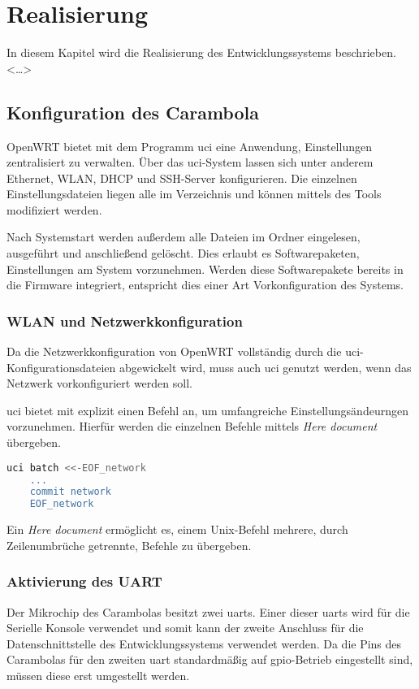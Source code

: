 \chapter{Realisierung}
In diesem Kapitel wird die Realisierung des Entwicklungssystems
beschrieben. <\ldots>
\section{Konfiguration des Carambola}
OpenWRT bietet mit dem Programm \gls{uci} eine Anwendung, Einstellungen
zentralisiert zu verwalten. Über das \gls{uci}-System lassen sich unter anderem
Ethernet, WLAN, DHCP und SSH-Server konfigurieren. Die einzelnen
Einstellungsdateien liegen alle im Verzeichnis  und
können mittels des Tools modifiziert werden.

Nach Systemstart werden außerdem alle Dateien im Ordner
 eingelesen, ausgeführt und anschließend gelöscht.
Dies erlaubt es Softwarepaketen, Einstellungen am System vorzunehmen. Werden
diese Softwarepakete bereits in die Firmware integriert, entspricht dies einer
Art Vorkonfiguration des Systems.
\subsection{WLAN und Netzwerkkonfiguration}
Da die Netzwerkkonfiguration von OpenWRT vollständig durch die
\gls{uci}-Konfigurationsdateien abgewickelt wird, muss auch \gls{uci} genutzt
werden, wenn das Netzwerk vorkonfiguriert werden soll.

\gls{uci} bietet mit  explizit einen Befehl an, um
umfangreiche Einstellungsändeurngen vorzunehmen. Hierfür werden die einzelnen
Befehle mittels \emph{Here document} übergeben.
\begin{lstlisting}[language=sh]
uci batch <<-EOF_network
	...
	commit network
	EOF_network
\end{lstlisting}

 \begin{definition}
Ein \emph{Here document} ermöglicht es, einem Unix-Befehl mehrere, durch
Zeilenumbrüche getrennte, Befehle zu übergeben.
\end{definition}

\subsection{Aktivierung des UART}\label{subs:aktuart}
Der Mikrochip\cite{RA01} des Carambolas besitzt zwei \glspl{uart}. Einer dieser
\glspl{uart} wird für die Serielle Konsole verwendet und somit kann der zweite
Anschluss für die Datenschnittstelle des Entwicklungssystems verwendet werden.
Da die Pins des Carambolas für den zweiten \gls{uart} standardmäßig auf
\gls{gpio}-Betrieb eingestellt sind, müssen diese erst umgestellt werden.

